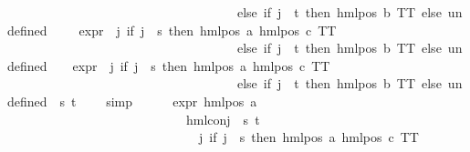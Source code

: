 \begin{isabellebody}
\ \ \ \ \ \ \ \ \ \ \ \ \ \ \ \ \ \ \ \ \ \ \ \ \ \ \ \ \ \ \ \ \ \ \ \ else\ if\ j\ {\isacharequal}{\kern0pt}\ t\ then\ hml{\isacharunderscore}{\kern0pt}pos\ b\ TT\ else\ undefined{\isacharparenright}{\kern0pt}\ {\isacharbackquote}{\kern0pt}\ {\isacharbraceleft}{\kern0pt}{\isacharbraceright}{\kern0pt}{\isacharparenright}{\kern0pt}{\isacharparenright}{\kern0pt}{\isacharparenright}{\kern0pt}\ \ {\isasymunion}\ {\isacharparenleft}{\kern0pt}expr{\isacharunderscore}{\kern0pt}{}\ {\isasymcirc}\ {\isacharparenleft}{\kern0pt}{\isasymlambda}j{\isachardot}{\kern0pt}\ if\ j\ {\isacharequal}{\kern0pt}\ s\ then\ hml{\isacharunderscore}{\kern0pt}pos\ a\ {\isacharparenleft}{\kern0pt}hml{\isacharunderscore}{\kern0pt}pos\ c\ TT{\isacharparenright}{\kern0pt}\isanewline
\ \ \ \ \ \ \ \ \ \ \ \ \ \ \ \ \ \ \ \ \ \ \ \ \ \ \ \ \ \ \ \ \ \ \ \ else\ if\ j\ {\isacharequal}{\kern0pt}\ t\ then\ hml{\isacharunderscore}{\kern0pt}pos\ b\ TT\ else\ undefined{\isacharparenright}{\kern0pt}{\isacharparenright}{\kern0pt}\ {\isacharbackquote}{\kern0pt}\ {\isacharbraceleft}{\kern0pt}{\isacharbraceright}{\kern0pt}\ {\isasymunion}\ {\isacharparenleft}{\kern0pt}expr{\isacharunderscore}{\kern0pt}{}\ {\isasymcirc}\ {\isacharparenleft}{\kern0pt}{\isasymlambda}j{\isachardot}{\kern0pt}\ if\ j\ {\isacharequal}{\kern0pt}\ s\ then\ hml{\isacharunderscore}{\kern0pt}pos\ a\ {\isacharparenleft}{\kern0pt}hml{\isacharunderscore}{\kern0pt}pos\ c\ TT{\isacharparenright}{\kern0pt}\isanewline
\ \ \ \ \ \ \ \ \ \ \ \ \ \ \ \ \ \ \ \ \ \ \ \ \ \ \ \ \ \ \ \ \ \ \ \ else\ if\ j\ {\isacharequal}{\kern0pt}\ t\ then\ hml{\isacharunderscore}{\kern0pt}pos\ b\ TT\ else\ undefined{\isacharparenright}{\kern0pt}{\isacharparenright}{\kern0pt}\ {\isacharbackquote}{\kern0pt}\ {\isacharbraceleft}{\kern0pt}s{\isacharcomma}{\kern0pt}\ t{\isacharbraceright}{\kern0pt}{\isacharparenright}{\kern0pt}\ {\isacharequal}{\kern0pt}\ {}{\isachardoublequoteclose}\ \isamarkupfalse%
\ simp\isanewline
\ \ \ \ \isamarkupfalse%
\ {\isachardoublequoteopen}expr{\isacharunderscore}{\kern0pt}{}\ {\isacharparenleft}{\kern0pt}hml{\isacharunderscore}{\kern0pt}pos\ a\isanewline
\ \ \ \ \ \ \ \ \ \ \ \ \ \ \ \ \ \ \ \ \ \ \ \ \ \ \ \ {\isacharparenleft}{\kern0pt}hml{\isacharunderscore}{\kern0pt}conj\ {\isacharbraceleft}{\kern0pt}{\isacharbraceright}{\kern0pt}\ {\isacharbraceleft}{\kern0pt}s{\isacharcomma}{\kern0pt}\ t{\isacharbraceright}{\kern0pt}\isanewline
\ \ \ \ \ \ \ \ \ \ \ \ \ \ \ \ \ \ \ \ \ \ \ \ \ \ \ \ \ \ {\isacharparenleft}{\kern0pt}{\isasymlambda}j{\isachardot}{\kern0pt}\ if\ j\ {\isacharequal}{\kern0pt}\ s\ then\ hml{\isacharunderscore}{\kern0pt}pos\ a\ {\isacharparenleft}{\kern0pt}hml{\isacharunderscore}{\kern0pt}pos\ c\ TT{\isacharparenright}{\kern0pt}\isanewline

\end{isabellebody}
